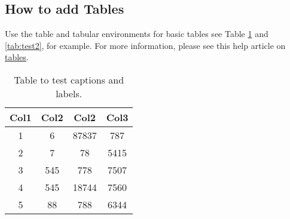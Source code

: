 \documentclass[a4paper,12pt,twoside]{article}
\begin{document}
\subsection{How to add Tables}

Use the table and tabular environments for basic tables see Table \ref{tab:test} and \ref{tab:test2}, for example. For more information, please see this help article on \href{https://www.overleaf.com/learn/latex/tables}{tables}. 

\begin{table}[h]
\centering
\caption{Table to test captions and labels.}
\label{tab:test}
\begin{tabular}{c c c c} 
    \hline
    Col1 & Col2 & Col2 & Col3 \\ 
    \hline
    1 & 6 & 87837 & 787 \\ 
    2 & 7 & 78 & 5415 \\
    3 & 545 & 778 & 7507 \\
    4 & 545 & 18744 & 7560 \\
    5 & 88 & 788 & 6344 \\ 
    \hline
\end{tabular}
\end{table}
\end{document}
